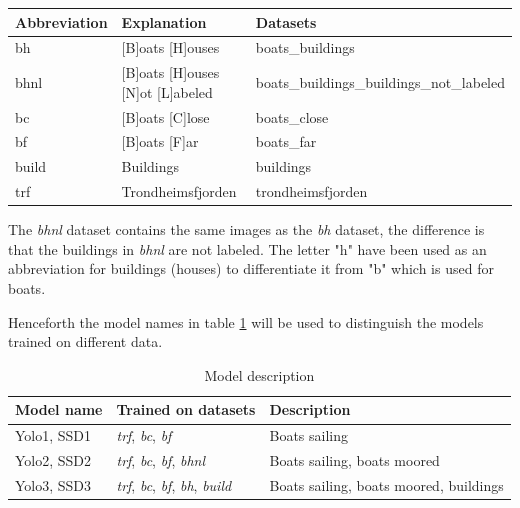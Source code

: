 \begin{table}[]
\begin{tabular}{l|l|l}
Abbreviation & Explanation                                      & Datasets                                  \\ \hline
bh           & {[}B{]}oats {[}H{]}ouses                         & boats\_buildings                          \\
bhnl         & {[}B{]}oats {[}H{]}ouses {[}N{]}ot {[}L{]}abeled & boats\_buildings\_buildings\_not\_labeled \\
bc           & {[}B{]}oats {[}C{]}lose                          & boats\_close                              \\
bf           & {[}B{]}oats {[}F{]}ar                            & boats\_far                                \\
build        & Buildings                                        & buildings                                 \\
trf          & Trondheimsfjorden                                & trondheimsfjorden                        
\end{tabular}
\end{table}

\newpage
The \textit{bhnl} dataset contains the same images as the \textit{bh} dataset, the difference is that the buildings in \textit{bhnl} are not labeled. The letter "h" have been used as an abbreviation for buildings (houses) to differentiate it from "b" which is used for boats.

\vspace{3mm}

Henceforth the model names in table \ref{tab_models} will be used to distinguish the models trained on different data.

\begin{table}[h!]
\centering
\begin{tabular}{l|ll}
Model name  & Trained on datasets    & Description                        \\ \hline
Yolo1, SSD1 & \textit{trf}, \textit{bc}, \textit{bf}            & Boats sailing                           \\
Yolo2, SSD2 & \textit{trf}, \textit{bc}, \textit{bf}, \textit{bhnl}      & Boats sailing, boats moored            \\
Yolo3, SSD3 & \textit{trf}, \textit{bc}, \textit{bf}, \textit{bh}, \textit{build} & Boats sailing, boats moored, buildings
\end{tabular}
\caption{Model description}
\label{tab_models}
\end{table}

